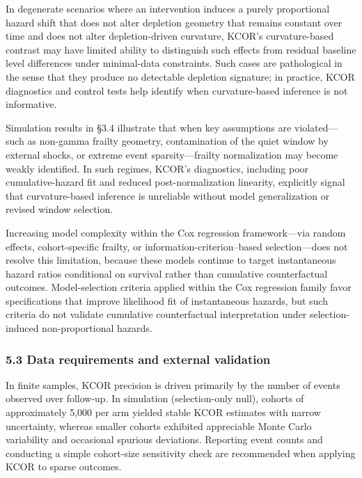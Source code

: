 \documentclass[
]{article}
\begin{document}
In degenerate scenarios where an intervention induces a purely
proportional hazard shift that does not alter depletion geometry that
remains constant over time and does not alter depletion-driven
curvature, KCOR's curvature-based contrast may have limited ability to
distinguish such effects from residual baseline level differences under
minimal-data constraints. Such cases are pathological in the sense that
they produce no detectable depletion signature; in practice, KCOR
diagnostics and control tests help identify when curvature-based
inference is not informative.

Simulation results in §3.4 illustrate that when key assumptions are
violated---such as non-gamma frailty geometry, contamination of the
quiet window by external shocks, or extreme event sparsity---frailty
normalization may become weakly identified. In such regimes, KCOR's
diagnostics, including poor cumulative-hazard fit and reduced
post-normalization linearity, explicitly signal that curvature-based
inference is unreliable without model generalization or revised window
selection.

Increasing model complexity within the Cox regression framework---via
random effects, cohort-specific frailty, or information-criterion--based
selection---does not resolve this limitation, because these models
continue to target instantaneous hazard ratios conditional on survival
rather than cumulative counterfactual outcomes. Model-selection criteria
applied within the Cox regression family favor specifications that
improve likelihood fit of instantaneous hazards, but such criteria do
not validate cumulative counterfactual interpretation under
selection-induced non-proportional hazards.

\subsubsection{5.3 Data requirements and external
validation}\label{data-requirements-and-external-validation}

In finite samples, KCOR precision is driven primarily by the number of
events observed over follow-up. In simulation (selection-only null),
cohorts of approximately 5,000 per arm yielded stable KCOR estimates
with narrow uncertainty, whereas smaller cohorts exhibited appreciable
Monte Carlo variability and occasional spurious deviations. Reporting
event counts and conducting a simple cohort-size sensitivity check are
recommended when applying KCOR to sparse outcomes.
\end{document}
